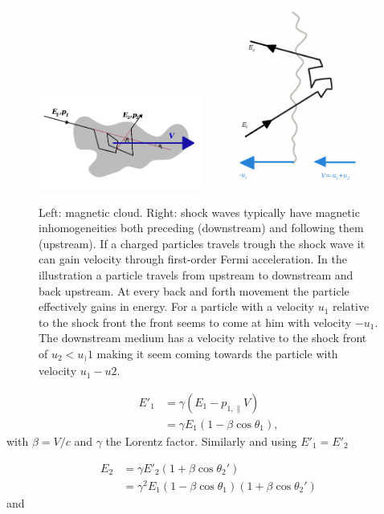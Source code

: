 \begin{figure}
\label{fig:cloud}
\centering
\includegraphics[width=0.48\textwidth]{chapter3/img/cloud.png}
\includegraphics[width=0.48\textwidth]{chapter3/img/shock.png}
\caption{Left: magnetic cloud. Right: shock waves typically have magnetic inhomogeneities both preceding (downstream) and following them (upstream). If a charged particles travels trough the shock wave it can gain velocity through first-order Fermi acceleration. In the illustration a particle travels from upstream to downstream and back upstream. At every back and forth movement the particle effectively gains in energy. For a particle with a velocity $u_1$ relative to the shock front the front seems to come at him with velocity $-u_1$. The downstream medium has a velocity relative to the shock front of $u_2 < u_)1$ making it seem coming towards the particle with velocity $u_1-u2$.}
\end{figure}

\begin{equation}
\begin{split}
E'_1 &= \gamma \left(E_1 - p_{1,\parallel} V\right) \\
&= \gamma E_1 \left(1-\beta \cos \theta_1\right),
\end{split}
\end{equation}
with $\beta = V/c$ and $\gamma$ the Lorentz factor. Similarly and using $E'_1 = E'_2$

\begin{equation}
\begin{split}
E_2 &= \gamma E'_2 \left(1+\beta \cos \theta_2'\right)\\
&=\gamma^2 E_1 \left(1-\beta \cos \theta_1\right) \left( 1 + \beta \cos \theta_2'\right)
\end{split}
\end{equation}
and

